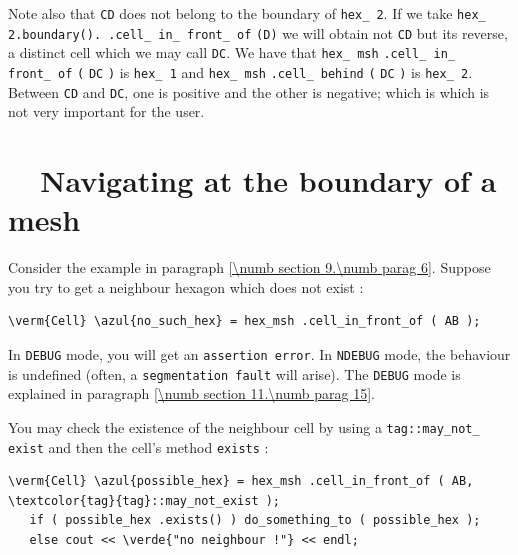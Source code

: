 Note also that {\small\tt CD} does not belong to the boundary of {\small\tt hex\_\,2}.
If we take {\small\tt hex\_\,2.boundary(). .cell\_\,in\_\,front\_\,of} {\small\tt (D)}
we will obtain not {\small\tt CD} but its reverse, a distinct cell which we may call {\small\tt DC}.
We have that {\small\tt hex\_\,msh} {\small\tt .cell\_\,in\_\,front\_\,of} {\small\tt (}
{\small\tt DC} {\small\tt )} is {\small\tt hex\_\,1} and {\small\tt hex\_\,msh}
{\small\tt .cell\_\,behind} {\small\tt (} {\small\tt DC} {\small\tt )} is {\small\tt hex\_\,2}.
Between {\small\tt CD} and {\small\tt DC}, one is positive and the other is negative;
which is which is not very important for the user.


\section{~~Navigating at the boundary of a mesh}\label{\numb section 9.\numb parag 7}

Consider the example in paragraph \ref{\numb section 9.\numb parag 6}.
Suppose you try to get a neighbour hexagon which does not exist :

\begin{Verbatim}[commandchars=\\\{\},formatcom=\small\tt,
   baselinestretch=0.94,framesep=2mm                      ]
   \verm{Cell} \azul{no_such_hex} = hex_msh .cell_in_front_of ( AB );
\end{Verbatim}

In {\small\tt DEBUG} mode, you will get an {\small\tt assertion error}.
In {\small\tt NDEBUG} mode, the behaviour is undefined
(often, a {\small\tt segmentation fault} will arise).
The {\small\tt DEBUG} mode is explained in paragraph \ref{\numb section 11.\numb parag 15}.

You may check the existence of the neighbour cell by using a
{\small\tt \textcolor{tag}{tag}::may\_\;not\_\,exist} and then the cell's method {\small\tt exists} :

\begin{Verbatim}[commandchars=\\\{\},formatcom=\small\tt,
   baselinestretch=0.94,framesep=2mm                      ]
   \verm{Cell} \azul{possible_hex} = hex_msh .cell_in_front_of ( AB, \textcolor{tag}{tag}::may_not_exist );
   if ( possible_hex .exists() ) do_something_to ( possible_hex );
   else cout << \verde{"no neighbour !"} << endl;
\end{Verbatim}

